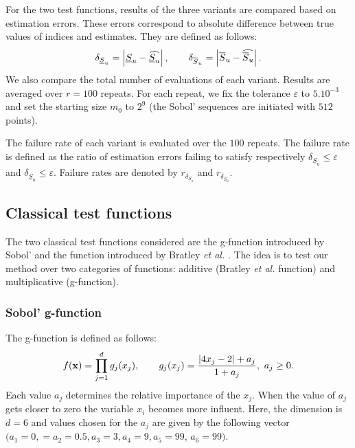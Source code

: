 For the two test functions, results of the three variants are compared based on estimation errors. These errors correspond to absolute difference between true values of indices and estimates. They are defined as follows:
$$\delta_{\underline{S}_u} = \left\lvert\underline{S}_u - \widehat{\underline{S}_u}\right\rvert, \qquad \delta_{\overline{S}_u} = \left\lvert\overline{S}_u - \widehat{\overline{S}_u}\right\rvert.$$
We also compare the total number of evaluations of each variant. Results are averaged over $r=100$ repeats. For each repeat, we fix the tolerance $\varepsilon$ to $5.10^{-3}$ and set the starting size $m_0$ to $2^9$ (the Sobol' sequences are initiated with $512$ points).

The failure rate of each variant is evaluated over the $100$ repeats. The failure rate is defined as the ratio of estimation errors failing to satisfy respectively $\delta_{\underline{S}_u} \leq \varepsilon$ and $\delta_{\underline{S}_u} \leq \varepsilon$. Failure rates are denoted by $r_{\delta_{\underline{S}_u}}$ and  $r_{\delta_{\overline{S}_u}}$.

%

\subsection{Classical test functions}
\label{sec:5.1}

The two classical test functions considered are the g-function introduced by Sobol' \cite{Sobol'} and the function introduced by Bratley \textit{et al.} \cite{Bratley}. The idea is to test our method over two categories of functions: additive (Bratley \textit{et al.} function) and multiplicative (g-function).

\subsubsection{Sobol' g-function}

The g-function is defined as follows:
\begin{equation*}
f(\boldsymbol{\mathbf{x}})= \prod \limits_{j=1}^{d}g_j(x_j), \qquad g_j(x_j)=\frac{\left |4x_j-2 \right | + a_j}{1 + a_j}, \ a_j \geq 0.
\end{equation*}
Each value $a_j$ determines the relative importance of the $x_j$. When the value of $a_j$ gets closer to zero the variable $x_i$ becomes more influent. Here, the dimension is $d=6$ and values chosen for the $a_j$ are given by the following vector $(a_1=0,=a_2=0.5, a_3=3, a_4=9, a_5=99$, $a_6=99)$.

